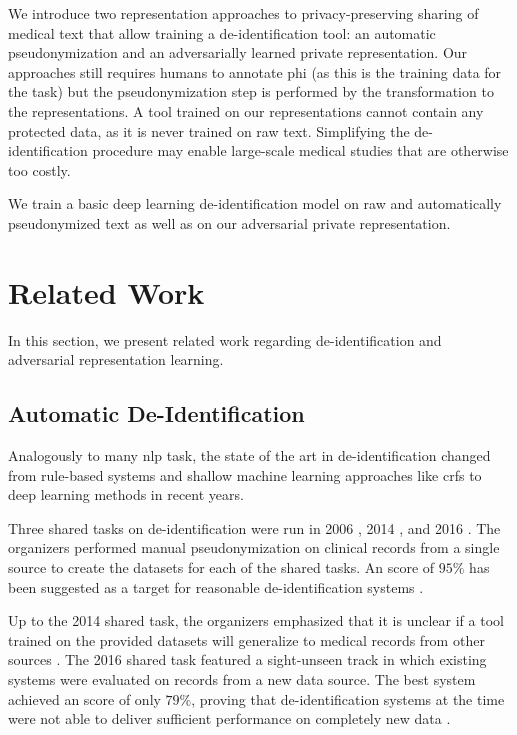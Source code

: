 %
We introduce two representation approaches to privacy-preserving sharing of medical text that allow training a de-identification tool: an automatic pseudonymization and an adversarially learned private representation.
%
Our approaches still requires humans to annotate \ac{phi} (as this is the training data for the task) but the pseudonymization step is performed by the transformation to the representations.
%
A tool trained on our representations cannot contain any protected data, as it is never trained on raw text.
%
Simplifying the de-identification procedure may enable large-scale medical studies that are otherwise too costly.

We train a basic deep learning de-identification model on raw and automatically pseudonymized text as well as on our adversarial private representation.
%

\section{Related Work}\label{sec:related}
%
In this section, we present related work regarding de-identification and adversarial representation learning.

\subsection{Automatic De-Identification}
%
Analogously to many \ac{nlp} task, the state of the art in de-identification changed from rule-based systems and shallow machine learning approaches like \acp{crf} \citep{uzuner2007evaluating,meystre2010automatic} to deep learning methods \citep{stubbs2017identification, dernoncourt2017identification, liu2017identification} in recent years.

%
Three shared tasks on de-identification were run in 2006 \citep{uzuner2007evaluating}, 2014 \citep{stubbs2015annotating, stubbs2015automated}, and 2016 \citep{stubbs2017identification}.
%
The organizers performed manual pseudonymization on clinical records from a single source to create the datasets for each of the shared tasks.
%
An \fone score of $95\%$ has been suggested as a target for reasonable de-identification systems \citep{stubbs2015automated}.

%
Up to the 2014 shared task, the organizers emphasized that it is unclear if a tool trained on the provided datasets will generalize to medical records from other sources \citep{uzuner2007evaluating,stubbs2015automated}.
%
The 2016 shared task featured a sight-unseen track in which existing systems were evaluated on records from a new data source.
%
The best system achieved an \fone score of only $79\%$, proving that de-identification systems at the time were not able to deliver sufficient performance on completely new data \citep{stubbs2017identification}.

